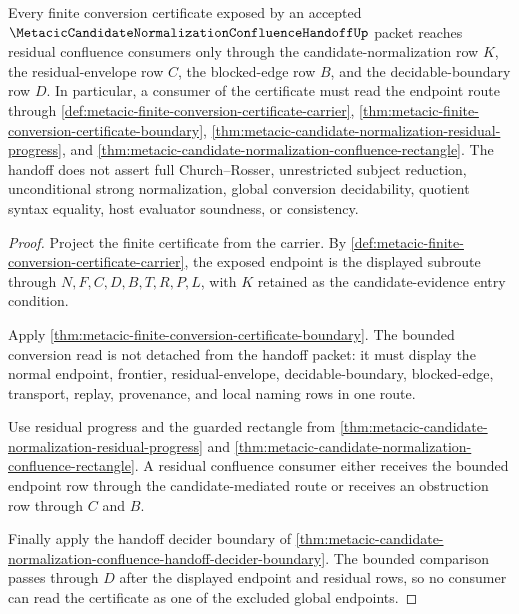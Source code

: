 \begin{theorem}
\label{thm:metacic-finite-conversion-endpoint-handoff}
Every finite conversion certificate exposed by an accepted $\MetacicCandidateNormalizationConfluenceHandoffUp$ packet reaches residual confluence consumers only through the candidate-normalization row $K$, the residual-envelope row $C$, the blocked-edge row $B$, and the decidable-boundary row $D$. In particular, a consumer of the certificate must read the endpoint route through \autoref{def:metacic-finite-conversion-certificate-carrier}, \autoref{thm:metacic-finite-conversion-certificate-boundary}, \autoref{thm:metacic-candidate-normalization-residual-progress}, and \autoref{thm:metacic-candidate-normalization-confluence-rectangle}. The handoff does not assert full Church--Rosser, unrestricted subject reduction, unconditional strong normalization, global conversion decidability, quotient syntax equality, host evaluator soundness, or consistency.
\end{theorem}
\begin{proof}
Project the finite certificate from the carrier. By \autoref{def:metacic-finite-conversion-certificate-carrier}, the exposed endpoint is the displayed subroute through $N,F,C,D,B,T,R,P,L$, with $K$ retained as the candidate-evidence entry condition.

Apply \autoref{thm:metacic-finite-conversion-certificate-boundary}. The bounded conversion read is not detached from the handoff packet: it must display the normal endpoint, frontier, residual-envelope, decidable-boundary, blocked-edge, transport, replay, provenance, and local naming rows in one route.

Use residual progress and the guarded rectangle from \autoref{thm:metacic-candidate-normalization-residual-progress} and \autoref{thm:metacic-candidate-normalization-confluence-rectangle}. A residual confluence consumer either receives the bounded endpoint row through the candidate-mediated route or receives an obstruction row through $C$ and $B$.

Finally apply the handoff decider boundary of \autoref{thm:metacic-candidate-normalization-confluence-handoff-decider-boundary}. The bounded comparison passes through $D$ after the displayed endpoint and residual rows, so no consumer can read the certificate as one of the excluded global endpoints.
\end{proof}

